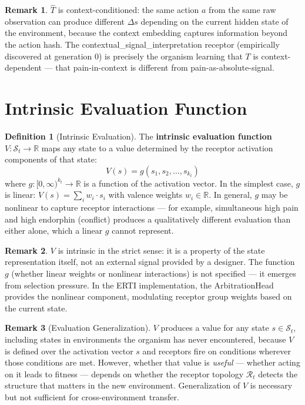 \documentclass[12pt]{article}
\theoremstyle{definition}
\newtheorem{definition}{Definition}
\newtheorem{remark}{Remark}
\begin{document}
\begin{remark}
$\hat{T}$ is context-conditioned: the same action $a$ from the same raw observation
can produce different $\Delta s$ depending on the current hidden state of the environment,
because the context embedding captures information beyond the action hash. The
contextual\_signal\_interpretation receptor (empirically discovered at generation 0)
is precisely the organism learning that $T$ is context-dependent --- that pain-in-context
is different from pain-as-absolute-signal.
\end{remark}

\section{Intrinsic Evaluation Function}

\begin{definition}[Intrinsic Evaluation]
The \textbf{intrinsic evaluation function} $V : \mathcal{S}_t \to \mathbb{R}$ maps any
state to a value determined by the receptor activation components of that state:
\[
V(s) = g(s_1, s_2, \ldots, s_{k_t})
\]
where $g : [0,\infty)^{k_t} \to \mathbb{R}$ is a function of the activation vector.
In the simplest case, $g$ is linear: $V(s) = \sum_{i} w_i \cdot s_i$ with valence
weights $w_i \in \mathbb{R}$. In general, $g$ may be nonlinear to capture receptor
interactions --- for example, simultaneous high pain and high endorphin (conflict)
produces a qualitatively different evaluation than either alone, which a linear $g$
cannot represent.
\end{definition}

\begin{remark}
$V$ is intrinsic in the strict sense: it is a property of the state representation itself,
not an external signal provided by a designer. The function $g$ (whether linear weights
or nonlinear interactions) is not specified --- it emerges from selection pressure.
In the ERTI implementation, the ArbitrationHead provides the nonlinear component,
modulating receptor group weights based on the current state.
\end{remark}

\begin{remark}[Evaluation Generalization]
$V$ produces a value for any state $s \in \mathcal{S}_t$, including states in environments
the organism has never encountered, because $V$ is defined over the activation vector
$s$ and receptors fire on conditions wherever those conditions are met. However, whether
that value is \emph{useful} --- whether acting on it leads to fitness --- depends on
whether the receptor topology $\mathcal{R}_t$ detects the structure that matters in the
new environment. Generalization of $V$ is necessary but not sufficient for
cross-environment transfer.
\end{remark}
\end{document}

